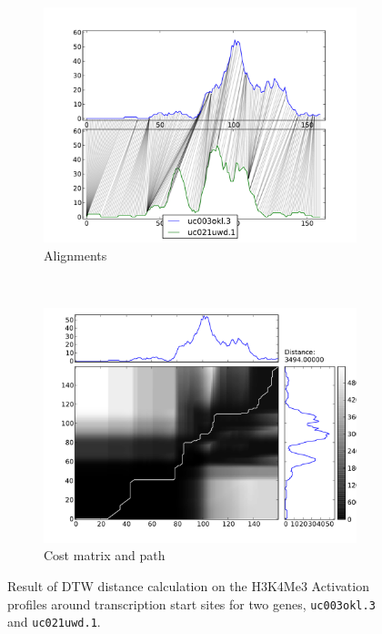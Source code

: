 \documentclass[parskip]{cs4rep}
\newcommand{\gene}[1]{{\tt #1}}
\newcommand{\histonemodification}[1]{#1}
\begin{document}
\begin{figure}
   \centering
   \begin{subfigure}[b]{0.45\textwidth}
       \centering
       \includegraphics[width=\textwidth]{figures/DTW/uc003okl_3-uc021uwd_1-mappings-std.pdf}
       \caption{Alignments}
       \label{fig:DTW:std:mappings}
   \end{subfigure}
   ~
   \begin{subfigure}[b]{0.45\textwidth}
       \centering
       \includegraphics[width=\textwidth]{figures/DTW/uc003okl_3-uc021uwd_1-cost-std.pdf}
       \caption{Cost matrix and path}
       \label{fig:DTW:std:cost}
   \end{subfigure}
   \caption{Result of DTW distance calculation on the \histonemodification{H3K4Me3} Activation profiles around transcription start sites for two genes,  \gene{uc003okl.3} and \gene{uc021uwd.1}.}
   \label{fig:DTW:std}
\end{figure}
\end{document}
